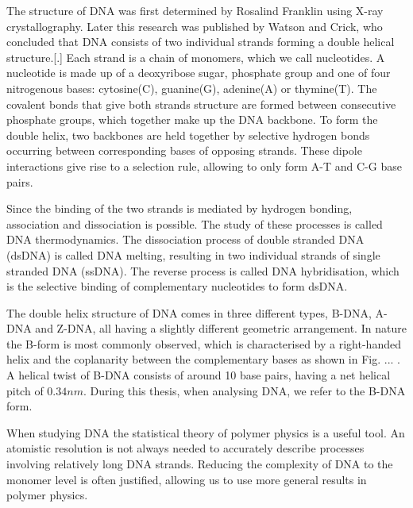 The structure of DNA was first determined by Rosalind Franklin using X-ray
crystallography. Later this research was published by Watson and Crick, who concluded
that DNA consists of two individual strands forming a double helical
structure.[.] Each strand is a chain of monomers, which we call nucleotides. A nucleotide
is made up of a
deoxyribose sugar, phosphate group and one of four nitrogenous bases: cytosine(C),
guanine(G), adenine(A) or thymine(T). The covalent bonds that give both strands structure
are formed between consecutive phosphate groups, which together make up the DNA backbone.
To form the double helix, two backbones are held together by
selective hydrogen bonds occurring between corresponding bases of opposing strands. These
dipole interactions give rise to a selection rule, allowing to only form A-T and C-G base
pairs.

Since the binding of the two strands is mediated by hydrogen bonding, association and
dissociation is possible. The study of these processes is called DNA thermodynamics. The
dissociation process of double stranded DNA (dsDNA) is called DNA melting, resulting in
two individual strands of single stranded DNA (ssDNA). The reverse process is called DNA
hybridisation, which is the selective binding of complementary nucleotides to form dsDNA.

The double helix structure of DNA comes in three different types, B-DNA, A-DNA and Z-DNA,
all having a slightly different geometric arrangement. In nature the B-form is most
commonly observed, which is characterised by a right-handed helix and the coplanarity
between the complementary bases as shown in Fig. ... . A helical twist of B-DNA consists
of around 10 base pairs, having a net helical pitch of $0.34 nm$. During this thesis,
when analysing DNA, we refer to the B-DNA form.

When studying DNA the statistical theory of polymer physics is a useful tool. An
atomistic resolution is not always needed to accurately describe processes involving
relatively long DNA strands.  Reducing the complexity of DNA to the monomer level is
often justified, allowing us to use more general results in polymer physics.



